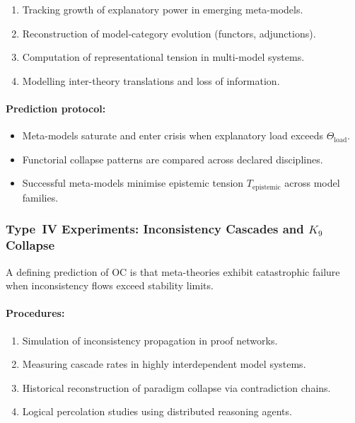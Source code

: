 \begin{enumerate}
    \item Tracking growth of explanatory power in emerging meta-models.
    \item Reconstruction of model-category evolution (functors, adjunctions).
    \item Computation of representational tension in multi-model systems.
    \item Modelling inter-theory translations and loss of information.
\end{enumerate}

\paragraph{Prediction protocol:}

\begin{itemize}
    \item Meta-models saturate and enter crisis when
          explanatory load exceeds $\Theta_{\mathrm{load}}$.
    \item Functorial collapse patterns are compared across declared disciplines.
    \item Successful meta-models minimise epistemic tension
          $T_{\mathrm{epistemic}}$ across model families.
\end{itemize}



\subsubsection{Type~IV Experiments: Inconsistency Cascades and \texorpdfstring{$K_9$}{K_9} Collapse}

A defining prediction of OC is that meta-theories exhibit
catastrophic failure when inconsistency flows exceed stability limits.

\paragraph{Procedures:}

\begin{enumerate}
    \item Simulation of inconsistency propagation in proof networks.
    \item Measuring cascade rates in highly interdependent model systems.
    \item Historical reconstruction of paradigm collapse via contradiction chains.
    \item Logical percolation studies using distributed reasoning agents.
\end{enumerate}

